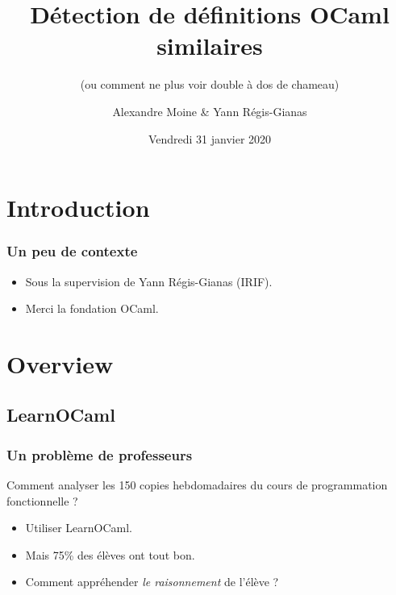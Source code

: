 \documentclass[11pt]{beamer}
\begin{document}
	\author{Alexandre Moine \& Yann Régis-Gianas}
	\title{Détection de définitions OCaml similaires}
	\subtitle{(ou comment ne plus voir double à dos de chameau)}
	\date{Vendredi 31 janvier 2020}
	\begin{frame}[plain]
		\maketitle
	\end{frame}

\section{Introduction}
\begin{frame}
	\frametitle{Un peu de contexte}
	\begin{itemize}
		\item Sous la supervision de Yann Régis-Gianas (IRIF).
		\item Merci la fondation OCaml.
	\end{itemize}
\end{frame}

\section{Overview}
\subsection{LearnOCaml}
\begin{frame}
	\frametitle{Un problème de professeurs}

Comment analyser les 150 copies hebdomadaires du cours de programmation fonctionnelle ?
\pause

\begin{itemize}
\item Utiliser LearnOCaml.
\pause
\item Mais 75\% des élèves ont tout bon.
\item Comment appréhender \emph{le raisonnement} de l'élève ?
\end{itemize}
\end{frame}
\end{document}

